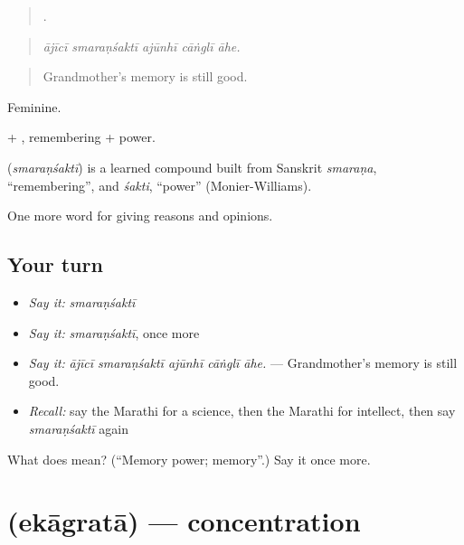 \begin{quote}
    .
\end{quote}

\begin{quote}
\emph{ājīcī smaraṇśaktī ajūnhī cāṅglī āhe.}
\end{quote}

\begin{quote}
Grandmother's memory is still good.
\end{quote}

Feminine.

 + , remembering + power.

\begin{cousinweb}
\textbf{} (\emph{smaraṇśaktī}) is a learned compound built from Sanskrit \emph{smaraṇa}, \textquotedblleft{}remembering\textquotedblright{}, and \emph{śakti}, \textquotedblleft{}power\textquotedblright{} (Monier-Williams).
\end{cousinweb}

\begin{grammarlens}[title={What you've built}]
One more word for giving reasons and opinions.
\end{grammarlens}

\subsection*{Your turn}
\begin{itemize}
\raggedright
  \item \emph{Say it:} \emph{smaraṇśaktī}
  \item \emph{Say it:} \emph{smaraṇśaktī}, once more
  \item \emph{Say it:} \emph{ājīcī smaraṇśaktī ajūnhī cāṅglī āhe.} — Grandmother's memory is still good.
  \item \emph{Recall:} say the Marathi for a science, then the Marathi for intellect, then say \emph{smaraṇśaktī} again
\end{itemize}

\begin{tcolorbox}[breakable,colback=teal!4,colframe=teal!35!black,title={Before you move on}]
What does  mean? (\textquotedblleft{}Memory power; memory\textquotedblright{}.) Say it once more.
\end{tcolorbox}
\section[\texorpdfstring{\mr{एकाग्रता} (ekāgratā)}{एकाग्रता (ekāgratā)}]{ (ekāgratā) — concentration}


